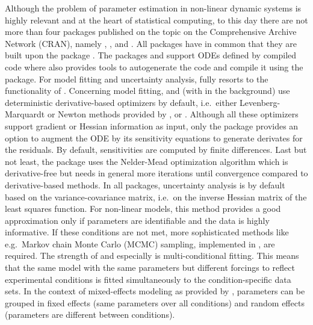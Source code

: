 \documentclass[article]{jss}
\begin{document}
Although the problem of parameter estimation in non-linear dynamic systems is highly relevant and at the heart of statistical computing, to this day there are not more than four  packages published on the topic on the Comprehensive  Archive Network (CRAN), namely  \citep{FME},  \citep{nlmeODE},  \citep{mkin} and  \citep{scaRabee}. All packages have in common that they are built upon the  package \citep{deSolve}.
The packages  and  support ODEs defined by compiled code where  also provides tools to autogenerate the  code and compile it using the  package. For model fitting and uncertainty analysis,  fully resorts to the functionality of .
Concerning model fitting,  and  (with  in the background) use deterministic derivative-based optimizers by default, i.e.~either Levenberg-Marquardt or Newton methods provided by ,  or . Although all these optimizers support gradient or Hessian information as input, only the  package provides an option to augment the ODE by its sensitivity equations to generate derivates for the residuals. By default, sensitivities are computed by finite differences. Last but not least, the  package uses the Nelder-Mead optimization algorithm which is derivative-free but needs in general more iterations until convergence compared to derivative-based methods.
In all packages, uncertainty analysis is by default based on the variance-covariance matrix, i.e.~on the inverse Hessian matrix of the least squares function. For non-linear models, this method provides a good approximation only if parameters are identifiable and the data is highly informative. If these conditions are not met, more sophisticated methods like e.g.~Markov chain Monte Carlo (MCMC) sampling, implemented in , are required.
The strength of  and especially  is multi-conditional fitting. This means that the same model with the same parameters but different forcings to reflect experimental conditions is fitted simultaneously to the condition-specific data sets. In the context of mixed-effects modeling as provided by , parameters can be grouped in fixed effects (same parameters over all conditions) and random effects (parameters are different between conditions).
\end{document}
